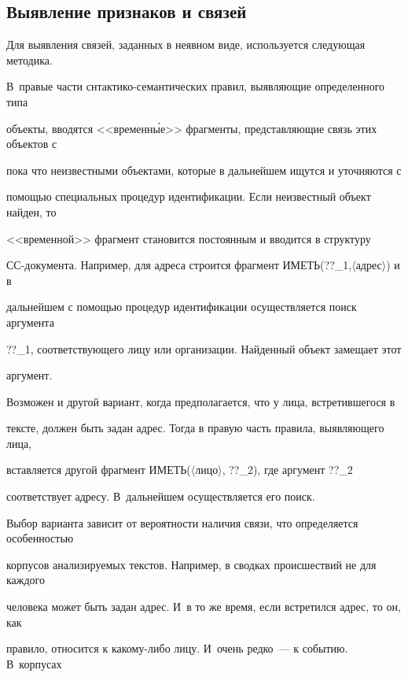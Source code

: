      \subsection{Выявление признаков и связей}





Для выявления связей, заданных в неявном виде, используется следующая методика. 


В~правые части снтактико-семантических правил, выявляющие определенного типа 


объекты,  вводятся <<временн\'{ы}е>> фрагменты, представляющие связь этих объектов с 


пока что неизвестными объектами, которые в дальнейшем ищутся и уточняются с 


помощью специальных процедур идентификации. Если неизвестный объект найден, то 


<<временной>> фрагмент становится постоянным и  вводится в структуру 


СС-документа. Например, для адреса строится фрагмент {\sf ИМЕТЬ(??\_1,$\langle$адрес$\rangle$)} и в 


дальнейшем с помощью процедур идентификации осуществляется поиск аргумента 


{\sf ??\_1}, соответствующего лицу или организации. Найденный объект замещает этот 


аргумент. 


     


Возможен и другой вариант, когда предполагается, что у лица, встретившегося в 


тексте,  должен быть задан адрес. Тогда в правую часть правила, выявляющего лица, 


вставляется другой фрагмент {\sf ИМЕТЬ($\langle$лицо$\rangle$, ??\_2)}, где аргумент {\sf ??\_2} 


соответствует адресу. В~дальнейшем осуществляется его поиск. 





Выбор варианта зависит от вероятности наличия связи, что определяется особенностью 


корпусов анализируемых текстов.  Например, в сводках про\-ис\-шест\-вий не для каждого 


человека может быть задан адрес. И~в то же время, если встретился адрес, то он, как 


правило, относится к какому-либо лицу. И~очень редко~--- к событию. В~корпусах 


